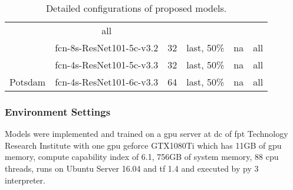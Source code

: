 \begin{table}[h]
\begin{tabular}{ | c | c | c | c | c | c | }
        & all \\
        \cline{2-6}
        & \acrshort{fcn}-8s-ResNet101-5c-v3.2 & 32 & last, 50\% & \acrshort{na}
        & all \\
        \cline{2-6}
        & \acrshort{fcn}-4s-ResNet101-5c-v3.3 & 32 & last, 50\% & \acrshort{na}
        & all \\
        \hline
        Potsdam & \acrshort{fcn}-4s-ResNet101-6c-v3.3 & 64 & last, 50\% &
        \acrshort{na} & all \\
        \hline
    \end{tabular}
    \caption{Detailed configurations of proposed models.}
    \label{tab:proposed_models}
\end{table}

\subsubsection{Environment Settings}
Models were implemented and trained on a \acrshort{gpu} server at \gls{dc} of
\gls{fpt} Technology Research Institute with one \acrshort{gpu} \gls{geforce}
GTX1080Ti which has 11GB of \acrshort{gpu} memory, compute capability index of
6.1, 756GB of system memory, 88 \acrshort{cpu} threads, runs on Ubuntu Server
16.04 and \gls{tf} 1.4 and executed by \Gls{py} 3 interpreter.
